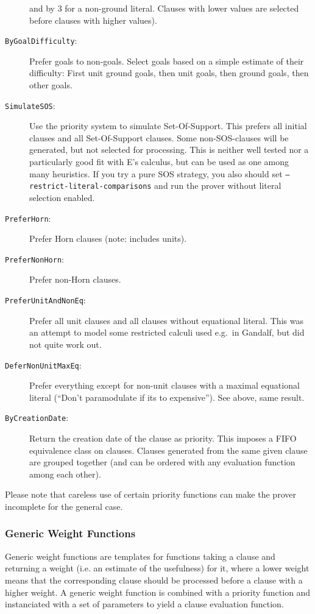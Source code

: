 \documentclass{article}
\begin{document}
\begin{description}
  and by 3 for a non-ground literal. Clauses with lower values are
  selected before clauses with higher values).
\item[\texttt{ByGoalDifficulty}:] Prefer goals to non-goals. Select
  goals based on a simple estimate of their difficulty: First unit
  ground goals, then unit goals, then ground goals, then other goals.
\item[\texttt{SimulateSOS}:] Use the priority system to simulate
  Set-Of-Support. This prefers all initial clauses and all
  Set-Of-Support clauses. Some non-SOS-clauses will be generated, but
  not selected for processing. This is neither well tested nor
  a particularly good fit with E's calculus, but can be used as one
  among many heuristics. If you try a pure SOS strategy, you also
  should set \texttt{--restrict-literal-comparisons} and run the
  prover without literal selection enabled.
\item[\texttt{PreferHorn}:] Prefer Horn clauses (note: includes units).
\item[\texttt{PreferNonHorn}:] Prefer non-Horn clauses.
\item[\texttt{PreferUnitAndNonEq}:] Prefer all unit clauses and all
  clauses without equational literal. This was an attempt to model
  some restricted calculi used e.g.~in Gandalf, but did not quite work
  out.
\item[\texttt{DeferNonUnitMaxEq}:] Prefer everything except for
  non-unit clauses with a maximal equational literal (``Don't
  paramodulate if its to expensive''). See above, same result.
\item[\texttt{ByCreationDate}:] Return the creation date of the clause
  as priority. This imposes a FIFO equivalence class on
  clauses. Clauses generated from the same given clause are grouped
  together (and can be ordered with any evaluation function among each
  other).
\end{description}

Please note that careless use of certain priority functions can make
the prover incomplete for the general case.


\subsubsection{Generic Weight Functions}

Generic weight functions are templates for functions taking a clause
and returning a weight (i.e. an estimate of the usefulness) for it,
where a lower weight means that the corresponding clause should be
processed before a clause with a higher weight.  A generic weight
function is combined with a priority function and instanciated with a
set of parameters to yield a clause evaluation function.
\end{document}
